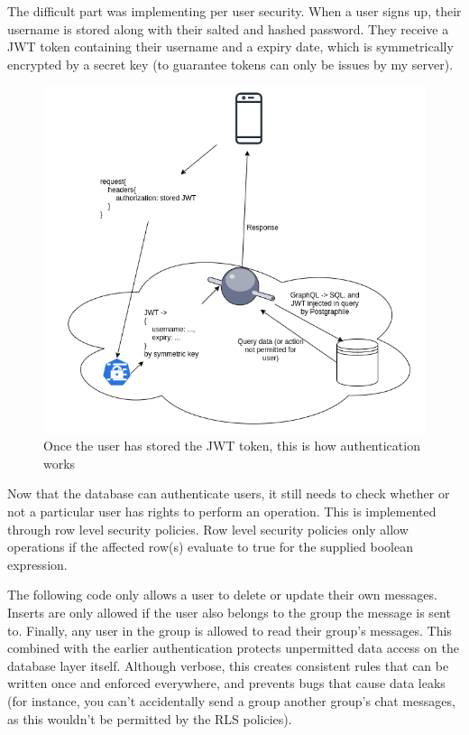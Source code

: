 \documentclass{l4proj}
\begin{document}
The difficult part was implementing per user security. When a user signs up, their username is stored along with their salted and hashed password. They receive a JWT token containing their username and a expiry date, which is symmetrically encrypted by a secret key (to guarantee tokens can only be issues by my server). 

\begin{figure}[H]
    \centering
    \includegraphics[width=1.0\linewidth]{authentication.png}    
    \caption{
  Once the user has stored the JWT token, this is how authentication works
    }
\end{figure}

Now that the database can authenticate users, it still needs to check whether or not a particular user has rights to perform an operation. This is implemented through row level security policies. Row level security policies only allow operations if the affected row(s) evaluate to true for the supplied boolean expression.

The following code only allows a user to delete or update their own messages. Inserts are only allowed if the user also belongs to the group the message is sent to. Finally, any user in the group is allowed to read their group's messages. This combined with the earlier authentication protects unpermitted data access on the database layer itself. Although verbose, this creates consistent rules that can be written once and enforced everywhere, and prevents bugs that cause data leaks (for instance, you can't accidentally send a group another group's chat messages, as this wouldn't be permitted by the RLS policies).
\end{document}
